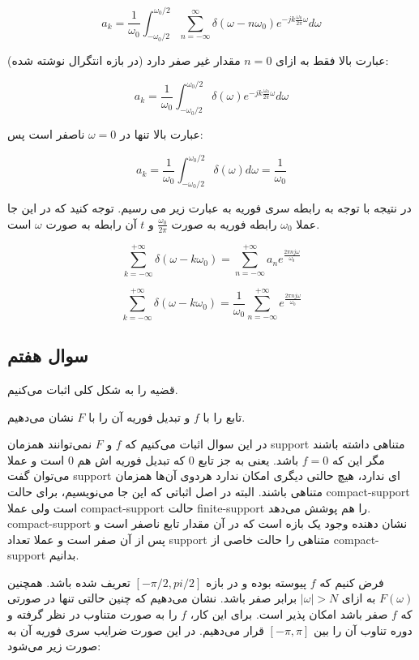 \documentclass[12pt]{article}
\begin{document}
$$a_k = \frac{1}{\omega_0} \int_{-\omega_0/2}^{\omega_0/2} \sum_{n=-\infty}^{\infty} \delta (\omega - n \omega_{0} ) e^{-jk\frac{\omega_0}{2 \pi} \omega} d\omega$$

عبارت بالا فقط به ازای $n=0$ مقدار غیر صفر دارد (در بازه انتگرال نوشته شده):

$$a_k = \frac{1}{\omega_0} \int_{-\omega_0/2}^{\omega_0 /2} \delta(\omega) e^{-j k \frac{\omega_0}{2\pi}\omega}  d\omega$$

عبارت بالا تنها در $\omega=0$ ناصفر است پس:

$$a_k = \frac{1}{\omega_0} \int_{-\omega_{0}/2}^{\omega_0/2} \delta(\omega) d\omega = \frac{1}{\omega_0}$$

در نتیجه با توجه به رابطه سری فوریه به عبارت زیر می رسیم. توجه کنید که در این جا عملا
 $\omega_0$
  رابطه فوریه به صورت 
   $\frac{\omega_0}{2\pi}$
   و $t$ آن رابطه به صورت $\omega$ است.
   

$$\sum_{k=-\infty}^{+\infty} \delta\left(\omega-k \omega_{0}\right)= \sum_{n=-\infty}^{+\infty} a_n e^{\frac{2 \pi n j \omega}{\omega_{0}}}$$

$$\sum_{k=-\infty}^{+\infty} \delta\left(\omega-k \omega_{0}\right)=\frac{1}{\omega_{0}} \sum_{n=-\infty}^{+\infty} e^{\frac{2 \pi n j \omega}{\omega_{0}}}$$

\newpage
\subsection{سوال هفتم}

قضیه را به شکل کلی اثبات می‌کنیم.

تابع را با $f$ و تبدیل فوریه آن را با $F$ نشان می‌دهیم.

در این سوال اثبات می‌کنیم که $f$ و  $F$ نمی‌توانند همزمان support متناهی داشته باشند مگر این که $f=0$ باشد. یعنی به جز تابع $0$ که تبدیل فوریه‌ اش هم $0$ است و عملا می‌توان گفت support ای ندارد، هیچ حالتی دیگری امکان ندارد هردوی آن‌ها همزمان متناهی باشند. البته در اصل اثباتی که این جا می‌نویسیم، برای حالت compact-support است ولی  عملا compact-support حالت finite-support را هم پوشش می‌دهد. compact-support نشان دهنده وجود یک بازه است که در آن مقدار تابع ناصفر است و پس از آن صفر است و عملا تعداد support متناهی را حالت خاصی از compact-support بدانیم.



فرض کنیم که $f$ پیوسته بوده و در بازه
$[-\pi/2 , pi/2]$
تعریف شده باشد. همچنین 
$F(\omega)$
به ازای 
$|\omega|>N$
برابر صفر باشد. نشان می‌دهیم که چنین حالتی تنها در صورتی که $f$ صفر باشد امکان پذیر است. برای این کار، $f$ را به صورت متناوب در نظر گرفته و دوره تناوب آن را بین
$[-\pi , \pi]$
قرار می‌دهیم. در این صورت ضرایب سری فوریه آن به صورت زیر می‌شود:
\end{document}
